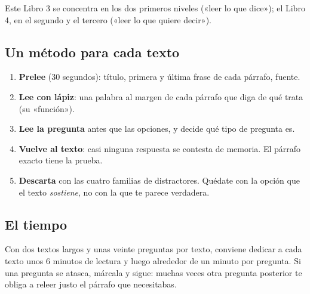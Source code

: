 Este Libro 3 se concentra en los dos primeros niveles («leer lo que dice»); el Libro 4, en el segundo y el tercero
(«leer lo que quiere decir»).

\subsection*{Un método para cada texto}
\begin{enumerate}
  \item \textbf{Prelee} (30 segundos): título, primera y última frase de cada párrafo, fuente.
  \item \textbf{Lee con lápiz}: una palabra al margen de cada párrafo que diga de qué trata (su «función»).
  \item \textbf{Lee la pregunta} antes que las opciones, y decide qué tipo de pregunta es.
  \item \textbf{Vuelve al texto}: casi ninguna respuesta se contesta de memoria. El párrafo exacto tiene la prueba.
  \item \textbf{Descarta} con las cuatro familias de distractores. Quédate con la opción que el texto \emph{sostiene}, no
  con la que te parece verdadera.
\end{enumerate}

\subsection*{El tiempo}
Con dos textos largos y unas veinte preguntas por texto, conviene dedicar a cada texto unos 6 minutos de lectura y luego
alrededor de un minuto por pregunta. Si una pregunta se atasca, márcala y sigue: muchas veces otra pregunta posterior te
obliga a releer justo el párrafo que necesitabas.
